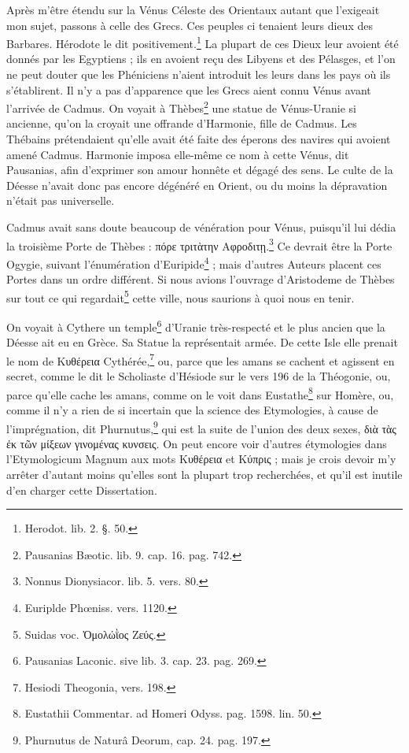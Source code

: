 \documentclass[a4paper, 11pt, oneside, polutonikogreek, french]{article}
\begin{document}
Après m'être étendu sur la Vénus Céleste des Orientaux autant que l'exigeait mon sujet, passons à celle des Grecs. Ces peuples ci tenaient leurs dieux des Barbares. Hérodote le dit positivement.\footnote{Herodot. lib. 2. §. 50.} La plupart de ces Dieux leur avoient été donnés par les Egyptiens ; ils en avoient reçu des Libyens et des Pélasges, et l'on ne peut douter que les Phéniciens n'aient introduit les leurs dans les pays où ils s'établirent. Il n'y a pas d'apparence que les Grecs aient connu Vénus avant l'arrivée de Cadmus. On voyait à Thèbes\footnote{Pausanias Bæotic. lib. 9. cap. 16. pag. 742.} une statue de Vénus-Uranie si ancienne, qu'on la croyait une offrande d'Harmonie, fille de Cadmus. Les Thébains prétendaient qu'elle avait été faite des éperons des navires qui avoient amené Cadmus. Harmonie imposa elle-même ce nom à cette Vénus, dit Pausanias, afin d'exprimer son amour honnête et dégagé des sens. Le culte de la Déesse n'avait donc pas encore dégénéré en Orient, ou du moins la dépravation n'était pas universelle.

Cadmus avait sans doute beaucoup de vénération pour Vénus, puisqu'il lui dédia la troisième Porte de Thèbes : πόρε τριτὰτην Αφροδιτῃ.\footnote{Nonnus Dionysiacor. lib. 5. vers. 80.} Ce devrait être la Porte Ogygie, suivant l'énumération d'Euripide\footnote{Euriplde Phœniss. vers. 1120.} ; mais d'autres Auteurs placent ces Portes dans un ordre différent. Si nous avions l'ouvrage d'Aristodeme de Thèbes sur tout ce qui regardait\footnote{Suidas voc. Ὀμολώῒος Ζεύς.} cette ville, nous saurions à quoi nous en tenir.

On voyait à Cythere un temple\footnote{Pausanias Laconic. sive lib. 3. cap. 23. pag. 269.} d'Uranie très-respecté et le plus ancien que la Déesse ait eu en Grèce. Sa Statue la représentait armée. De cette Isle elle prenait le nom de Κυθέρεια Cythérée,\footnote{Hesiodi Theogonia, vers. 198.} ou, parce que les amans se cachent et agissent en secret, comme le dit le Scholiaste d'Hésiode sur le vers 196 de la Théogonie, ou, parce qu'elle cache les amans, comme on le voit dans Eustathe\footnote{Eustathii Commentar. ad Homeri Odyss. pag. 1598. lin. 50.} sur Homère, ou, comme il n'y a rien de si incertain que la science des Etymologies, à cause de l'imprégnation, dit Phurnutus,\footnote{Phurnutus de Naturâ Deorum, cap. 24. pag. 197.} qui est la suite de l'union des deux sexes, διὰ τὰς ἐκ τῶν μίξεων γινομένας κυνσεις. On peut encore voir d'autres étymologies dans l'Etymologicum Magnum aux mots Κυθέρεια et Κύπρις ; mais je crois devoir m'y arrêter d'autant moins qu'elles sont la plupart trop recherchées, et qu'il est inutile d'en charger cette Dissertation.
\end{document}
